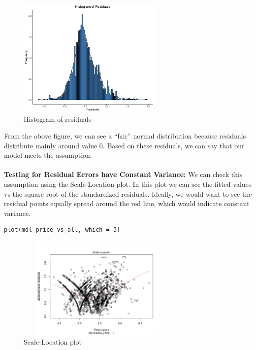 \documentclass[a4paper]{article}
\theoremstyle{definition}
\begin{document}
\begin{figure}[h!]
\begin{center}
\includegraphics[width=7cm,length=8cm]{images/hist.png}
\end{center}
\caption{Histogram of residuals}
\end{figure}
\pagebreak
From the above figure, we can see a “fair” normal distribution because residuals distribute mainly around value 0. Based on these residuals, we can say that our model meets the assumption.\\
\\
\textbf{Testing for Residual Errors have Constant Variance:} We can check this assumption using the Scale-Location plot. In this plot we can see the fitted values vs the square root of the standardized residuals. Ideally, we would want to see the residual points equally spread around the red line, which would indicate constant variance.
\begin{mdframed}[leftline=false,rightline=false,backgroundcolor=lightblue!10,nobreak=false]
    \begin{verbatim}
plot(mdl_price_vs_all, which = 3)
\end{verbatim}
\end{mdframed}
\begin{figure}[h!]
\begin{center}
\includegraphics[width=8cm,height=5cm]{images/scale_l.png}
\end{center}
\caption{Scale-Location plot}
\end{figure}
\end{document}
